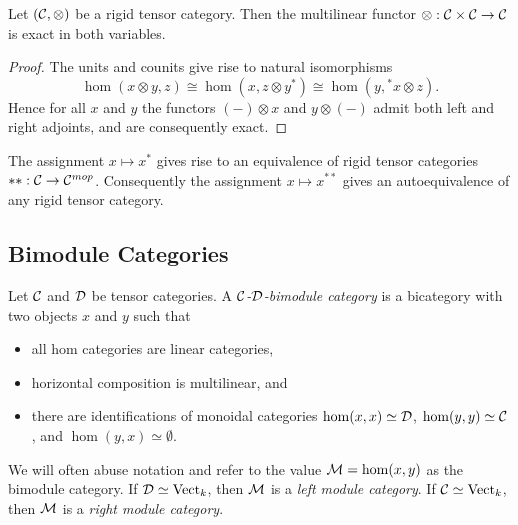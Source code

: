 \documentclass{amsart}
\begin{document}
\begin{lemma} \label{lma:RigidIsExact}
	Let $(\mathcal C, \otimes)$ be a rigid tensor category. Then the multilinear functor $\otimes: \mathcal C \times \mathcal C \to \mathcal C$ is exact in both variables. 
\end{lemma}

\begin{proof}
	The units and counits give rise to natural isomorphisms
 \begin{equation*}
 	\hom(x \otimes y, z) \cong \hom( x, z \otimes y^*) \cong \hom(y, {}^*x \otimes z).
 \end{equation*}
	Hence for all $x$ and $y$ the functors $(-)\otimes x$ and $y \otimes (-)$ admit both left and right adjoints, and are consequently exact. 
\end{proof}

\begin{remark}
	The assignment $x \mapsto x^*$ gives rise to an equivalence of rigid tensor categories $**: \mathcal C \to \mathcal C^{mop}$. Consequently the assignment $x \mapsto x^{**}$ gives an autoequivalence of any rigid tensor category. 
\end{remark}

\subsection{Bimodule Categories}

\begin{definition}
	Let $\mathcal C$ and $\mathcal D$ be tensor categories. A {\em $\mathcal C$-$\mathcal D$-bimodule category} is a bicategory with two objects $x$ and $y$ such that
	\begin{itemize}
		\item all hom categories are linear categories, 
		\item horizontal composition is multilinear, and
		\item there are identifications of monoidal categories $\hom(x,x) \simeq \mathcal D$, $\hom(y,y) \simeq \mathcal C$, and $\hom(y,x) \simeq \emptyset$.
	\end{itemize}
	We will often abuse notation and refer to the value $\mathcal M = \hom(x,y)$ as the bimodule category. If $\mathcal D \simeq \mathrm{Vect}_k$, then $\mathcal M$ is a {\em left module category}. If $\mathcal C \simeq \mathrm{Vect}_k$, then $\mathcal M$ is a {\em right module category}.
\end{definition}
	
\end{document}
